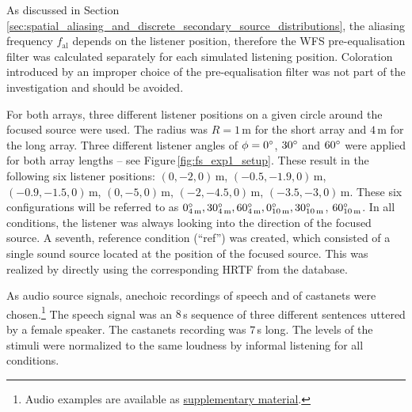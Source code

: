 As discussed in
Section\,\ref{sec:spatial_aliasing_and_discrete_secondary_source_distributions},
the aliasing frequency
$f_\text{al}$ depends on the listener position, therefore the WFS
pre-equalisation filter was
calculated separately for each simulated listening position.
Coloration introduced by an improper choice of the
pre-equalisation filter was not part of the investigation
and should be avoided.

For both arrays, three different listener positions on a given circle around the
focused source were used. The radius was $R = 1$\,m for the short array and
$4$\,m for the long array.  Three different listener angles of $\phi =
0^\circ$, $30^\circ$ and $60^\circ$ were applied for both array lengths -- see
Figure\,\ref{fig:fs_exp1_setup}. These result in the following six listener
positions: $(0,-2,0)$\,m, $(-0.5,-1.9,0)$\,m, $(-0.9,-1.5,0)$\,m, $(0,-5,0)$\,m,
$(-2,-4.5,0)$\,m, $(-3.5,-3,0)$\,m.
These six configurations will be referred to as $0^\circ_{4\,\text{m}},
30^\circ_{4\,\text{m}}, 60^\circ_{4\,\text{m}}, 0^\circ_{10\,\text{m}},
30^\circ_{10\,\text{m}}$, $60^\circ_{10\,\text{m}}$.  In all conditions, the
listener was always looking into the direction of the focused source.  A seventh,
reference condition (``ref'') was created, which consisted of a
single sound source located at the position of the focused source.
This was realized by directly using the corresponding \ac{HRTF} from the database.

As audio source signals, anechoic recordings of speech and of castanets were
chosen.\footnote{Audio examples are available as
\href{http://audio.qu.tu-berlin.de/?p=625}{\color{link}supplementary
material}.} The speech signal was an $8$\,s
sequence of three different sentences uttered by a female speaker. The
castanets recording was $7$\,s long. The levels of the stimuli were normalized to
the same loudness by informal listening for all conditions.


